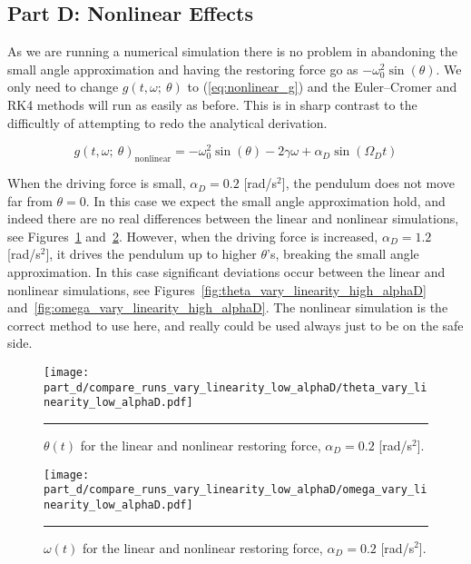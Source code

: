 \documentclass[notitlepage,aps,prd,nofootinbib]{revtex4-1}
\begin{document}
\clearpage
\subsection{Part D: Nonlinear Effects}
\label{subsec:nonlinear_effects}
As we are running a numerical simulation there is no problem in abandoning the small angle approximation and having the restoring force go as $-\omega_{0}^2 \sin\left(\theta\right)$. We only need to change $g\left(t, \omega;~\theta\right)$ to (\ref{eq:nonlinear_g}) and the Euler--Cromer and RK4 methods will run as easily as before. This is in sharp contrast to the difficultly of attempting to redo the analytical derivation.

\begin{equation}
\label{eq:nonlinear_g}
g\left(t, \omega;~\theta\right)_{\text{nonlinear}} = -\omega_{0}^2 \sin\left(\theta\right) - 2\gamma \omega + \alpha_{D}\sin\left(\Omega_{D} t\right)
\end{equation}

When the driving force is small, $\alpha_{D} = 0.2$ [rad/s$^2$], the pendulum does not move far from $\theta = 0$. In this case we expect the small angle approximation hold, and indeed there are no real differences between the linear and nonlinear simulations, see Figures~\ref{fig:theta_vary_linearity_low_alphaD} and~\ref{fig:omega_vary_linearity_low_alphaD}. However, when the driving force is increased, $\alpha_{D} = 1.2$ [rad/s$^2$], it drives the pendulum up to higher $\theta$'s, breaking the small angle approximation. In this case significant deviations occur between the linear and nonlinear simulations, see Figures~\ref{fig:theta_vary_linearity_high_alphaD} and~\ref{fig:omega_vary_linearity_high_alphaD}. The nonlinear simulation is the correct method to use here, and really could be used always just to be on the safe side. 

\clearpage
\begin{figure}[!htbc]
  \centering
  \texttt{[image: part\_d/compare\_runs\_vary\_linearity\_low\_alphaD/theta\_vary\_linearity\_low\_alphaD.pdf]}
	{\par\nobreak\rule[9pt]{35em}{0.5pt}\vspace{-5mm}}
	\caption{$\theta\left(t\right)$ for the linear and nonlinear restoring force, $\alpha_{D} = 0.2$ [rad/s$^2$].}
	\label{fig:theta_vary_linearity_low_alphaD}
\end{figure}

\begin{figure}[!htbc]
  \centering
  \texttt{[image: part\_d/compare\_runs\_vary\_linearity\_low\_alphaD/omega\_vary\_linearity\_low\_alphaD.pdf]}
	{\par\nobreak\rule[9pt]{35em}{0.5pt}\vspace{-5mm}}
	\caption{$\omega\left(t\right)$ for the linear and nonlinear restoring force, $\alpha_{D} = 0.2$ [rad/s$^2$].}
	\label{fig:omega_vary_linearity_low_alphaD}
\end{figure}
\end{document}
